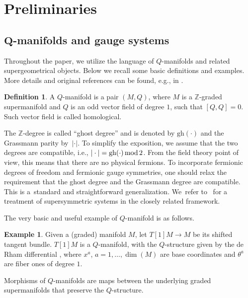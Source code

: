 \documentclass[10pt,a4paper]{amsart}
\numberwithin{equation}{section}
\theoremstyle{definition}
\newtheorem{Definition}[Theorem]{Definition}
\newtheorem{Example}[Theorem]{Example}
\renewcommand{\mod}{\,\rm mod \,}
\newcommand{\p}[1]{|#1|}
\newcommand{\gh}[1]{\mathrm{gh}(#1)}
\newcommand{\fZ}{\mathbb{Z}}
\begin{document}
\section{Preliminaries}
\label{sec:prelim}
\subsection[Q-manifolds and gauge systems]{$\boldsymbol{Q}$-manifolds and gauge systems}

Throughout the paper, we utilize the language of $Q$-manifolds and related supergeometrical objects. Below we recall some basic definitions and examples.
More details and original references can be found, e.g., in \cite{Kotov:2007nr,Mehta:2007rgt,Schwarz:1992nx,Vaintrob:1997,Voronov:2009nr}.
\begin{Definition}
 A $Q$-manifold is a pair $(M,Q)$, where $M$ is a $\mathbb{Z}$-graded supermanifold and $Q$ is an odd vector field of degree $1$, such that $[Q,Q]=0$. Such vector field is called homological.
\end{Definition}
The $\fZ$-degree is called ``ghost degree'' and is denoted by $\gh{\cdot}$ and the Grassmann parity by~$\p{\cdot}$. To simplify the exposition, we assume that the two degrees are compatible, i.e., ${\p{\cdot}=\gh{\cdot} \mod 2}$.
From the field theory point of view, this means that there are no physical fermions. To incorporate fermionic degrees of freedom and fermionic gauge symmetries, one should relax the requirement that the ghost degree and the Grassmann degree are compatible. This is a~standard and straightforward generalization. We~refer to~\cite{Grigoriev:2025vsl} for a treatment of supersymmetric systems in the closely related framework.

The very basic and useful example of $Q$-manifold is as follows.

\begin{Example}
 Given a (graded) manifold $M$, let $T[1]M\rightarrow M$ be its shifted tangent bundle. $T[1]M$ is a $Q$-manifold, with the $Q$-structure given by the de Rham differential , where $x^a$, $a=1,\dots, \dim(M)$
 are base coordinates and $\theta^a$ are fiber ones of degree $1$.
\end{Example}

Morphisms of $Q$-manifolds are maps between the underlying graded supermanifolds that preserve the $Q$-structure.
\end{document}
